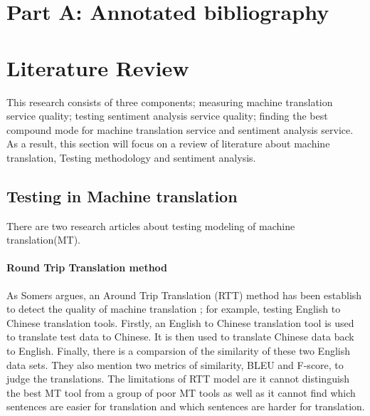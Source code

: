 \documentclass[conference]{IEEEtran}
\begin{document}
\section{Part A: Annotated bibliography}

\section{Literature Review}
This research consists of three components; measuring machine translation
service quality; testing sentiment analysis service quality;
finding the best compound mode for machine translation service and
sentiment analysis service.
As a result, this section will focus on a review of literature about machine
translation, Testing methodology and sentiment analysis.
\subsection{Testing in Machine translation}
There are two research articles about testing modeling of machine
translation(MT).

\paragraph{Round Trip Translation method}
As Somers argues, an Around Trip Translation (RTT) method has been establish to
detect the quality of machine translation \cite{roundTripTranslation}; for example, testing English to Chinese translation tools.
Firstly, an English to Chinese translation tool is used to translate test data to
Chinese. It is then used to translate Chinese data back to English.
Finally, there is a comparsion of the similarity of these two English data sets.
They also mention two metrics of similarity, BLEU and F-score, to judge the
translations. The limitations of RTT model are it cannot distinguish the best
MT tool from a group of poor MT tools as well as it cannot find which sentences are easier for
translation and which sentences are harder for translation.
\end{document}
